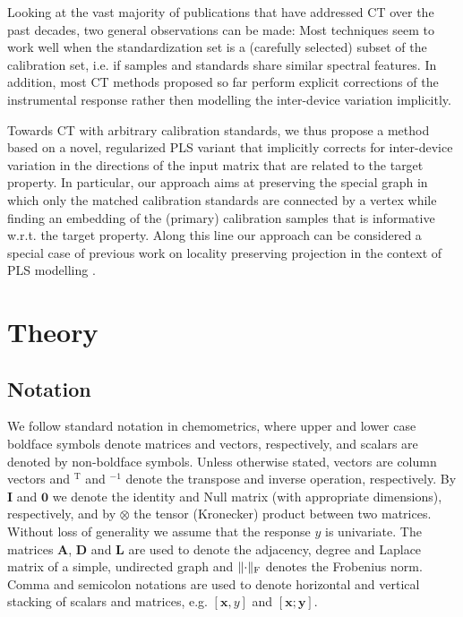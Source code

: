 \documentclass{article}
\newcommand{\T }{^{\text{T}}}
\DeclarePairedDelimiter{\normtwo}{\lVert}{\rVert}
\let\vec\mathbf
\begin{document}
Looking at the vast majority of publications that have addressed CT over the past decades, two general observations can be made: Most techniques seem to work well when the standardization set is a (carefully selected) subset of the calibration set, i.e. if samples and standards share similar spectral features. In addition, most CT methods proposed so far perform explicit corrections of the instrumental response rather then modelling the inter-device variation implicitly. 

Towards CT with arbitrary calibration standards, we thus propose a method based on a novel, regularized PLS variant that implicitly corrects for inter-device variation in the directions of the input matrix that are related to the target property. In particular, our approach aims at preserving the special graph in which only the matched calibration standards are connected by a vertex while finding an embedding of the (primary) calibration samples that is informative w.r.t. the target property. Along this line our approach can be considered a special case of previous work on locality preserving projection \cite{10.5555/2981345.2981365} in the context of PLS modelling \cite{doi:10.1021/acs.iecr.5b02559,8859330}.     

\section{Theory}
\label{sec:Theory}

\subsection{Notation}
We follow standard notation in chemometrics, where upper and lower case boldface symbols denote matrices and vectors, respectively, and scalars are denoted by non-boldface symbols. Unless otherwise stated, vectors are column vectors and $\T$ and $^{-1}$ denote the transpose and inverse operation, respectively. By $\vec I$ and $\boldsymbol 0$ we denote the identity and Null matrix (with appropriate dimensions), respectively, and by $\otimes$ the tensor (Kronecker) product between two matrices. Without loss of generality we assume that the response $y$ is univariate. The matrices $\vec A$, $\vec D$ and $\vec L$ are used to denote the adjacency, degree and Laplace matrix of a simple, undirected graph and $\normtwo{\cdot}_\text{F}$ denotes the Frobenius norm. Comma and semicolon notations are used to denote horizontal and vertical stacking of scalars and matrices, e.g. $[\vec x, y]$ and $[\vec x;\vec y]$.    
\end{document}
